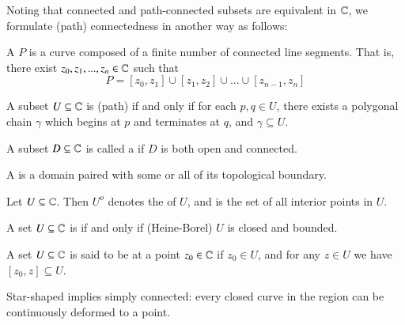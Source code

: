 Noting that connected and path-connected subsets are equivalent in $\mathbb C$, we formulate (path) connectedness in another way as follows:

\begin{definition}
    A  $P$ is a curve composed of a finite number of connected line segments. That is, there exist $z_0,z_1,...,z_n \in \mathbb C$ such that \begin{equation*}
        P = [z_0,z_1] \cup [z_1,z_2] \cup ... \cup [z_{n-1},z_n]
    \end{equation*}
\end{definition}

\begin{definition}
    A subset $U \subseteq \mathbb C$ is (path)  if and only if for each $p,q \in U$, there exists a polygonal chain $\gamma$ which begins at $p$ and terminates at $q$, and $\gamma \subseteq U$.
\end{definition}
    


\begin{definition}
    A subset $D \subseteq \mathbb C$ is called a  if $D$ is both open and connected.
\end{definition}


\begin{definition}
    A  is a domain paired with some or all of its topological boundary.
\end{definition}

\begin{definition}
    Let $U \subseteq \mathbb C$. Then $U^o$ denotes the  of $U$, and is the set of all interior points in $U$.
\end{definition}

\begin{definition}
    A set $U \subseteq \mathbb C$ is  if and only if (Heine-Borel) $U$ is closed and bounded.
\end{definition}


\begin{definition}
    A set $U \subseteq \mathbb C$ is said to be  at a point $z_0 \in \mathbb C$ if $z_0 \in U$, and for any $z \in U$ we have $[z_0,z] \subseteq U$.
\end{definition}

Star-shaped implies simply connected: every closed curve in the region can be continuously deformed to a point.

